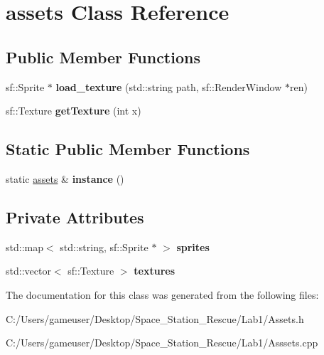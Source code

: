 \hypertarget{classassets}{}\section{assets Class Reference}
\label{classassets}
\subsection*{Public Member Functions}
\begin{DoxyCompactItemize}
\item 
\mbox{\label{classassets_a7db313932276ca83ba2883779a2a1d76}} 
sf\+::\+Sprite $\ast$ {\bfseries load\+\_\+texture} (std\+::string path, sf\+::\+Render\+Window $\ast$ren)
\item 
\mbox{\label{classassets_a7c5ab07fe3e33b8daef3e74d500e99f5}} 
sf\+::\+Texture {\bfseries get\+Texture} (int x)
\end{DoxyCompactItemize}
\subsection*{Static Public Member Functions}
\begin{DoxyCompactItemize}
\item 
\mbox{\label{classassets_a042531fa031ab10461a2f0e613f33da5}} 
static \mbox{\hyperlink{classassets}{assets}} \& {\bfseries instance} ()
\end{DoxyCompactItemize}
\subsection*{Private Attributes}
\begin{DoxyCompactItemize}
\item 
\mbox{\label{classassets_a32f1dc26d3421e65146b3017ab326c95}} 
std\+::map$<$ std\+::string, sf\+::\+Sprite $\ast$ $>$ {\bfseries sprites}
\item 
\mbox{\label{classassets_a30ce3343ecb0a4c5c30b21e5cf5a9e7c}} 
std\+::vector$<$ sf\+::\+Texture $>$ {\bfseries textures}
\end{DoxyCompactItemize}


The documentation for this class was generated from the following files\+:\begin{DoxyCompactItemize}
\item 
C\+:/\+Users/gameuser/\+Desktop/\+Space\+\_\+\+Station\+\_\+\+Rescue/\+Lab1/Assets.\+h\item 
C\+:/\+Users/gameuser/\+Desktop/\+Space\+\_\+\+Station\+\_\+\+Rescue/\+Lab1/Asssets.\+cpp\end{DoxyCompactItemize}
